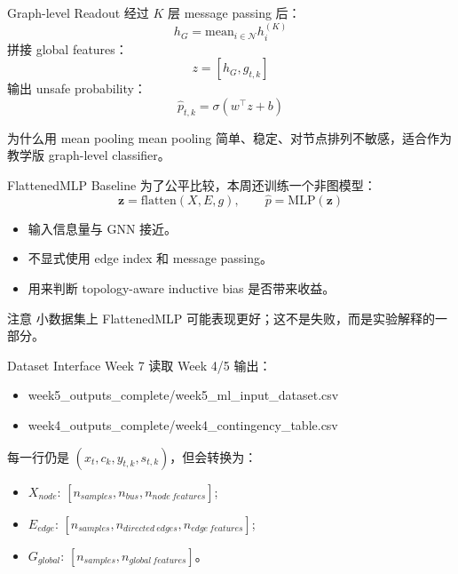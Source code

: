 \documentclass[aspectratio=169,11pt]{beamer}
\newcommand{\sigmoid}{\sigma}
\begin{document}
\begin{frame}{Graph-level Readout}
经过 $K$ 层 message passing 后：
\[
h_G=\mathrm{mean}_{i\in\mathcal N}h_i^{(K)}
\]
拼接 global features：
\[
z=[h_G,g_{t,k}]
\]
输出 unsafe probability：
\[
\hat p_{t,k}=\sigmoid(w^\top z+b)
\]
\begin{block}{为什么用 mean pooling}
mean pooling 简单、稳定、对节点排列不敏感，适合作为教学版 graph-level classifier。
\end{block}
\end{frame}

\begin{frame}{FlattenedMLP Baseline}
为了公平比较，本周还训练一个非图模型：
\[
\mathbf z=\mathrm{flatten}(X,E,g),\qquad \hat p=\mathrm{MLP}(\mathbf z)
\]
\begin{itemize}
  \item 输入信息量与 GNN 接近。
  \item 不显式使用 edge index 和 message passing。
  \item 用来判断 topology-aware inductive bias 是否带来收益。
\end{itemize}
\begin{alertblock}{注意}
小数据集上 FlattenedMLP 可能表现更好；这不是失败，而是实验解释的一部分。
\end{alertblock}
\end{frame}

\begin{frame}{Dataset Interface}
Week 7 读取 Week 4/5 输出：
\begin{itemize}
  \item week5\_outputs\_complete/week5\_ml\_input\_dataset.csv
  \item week4\_outputs\_complete/week4\_contingency\_table.csv
\end{itemize}
每一行仍是 $(x_t,c_k,y_{t,k},s_{t,k})$，但会转换为：
\begin{itemize}
  \item $X_{node}$: $[n_{samples}, n_{bus}, n_{node\ features}]$;
  \item $E_{edge}$: $[n_{samples}, n_{directed\ edges}, n_{edge\ features}]$;
  \item $G_{global}$: $[n_{samples}, n_{global\ features}]$。
\end{itemize}
\end{frame}
\end{document}

